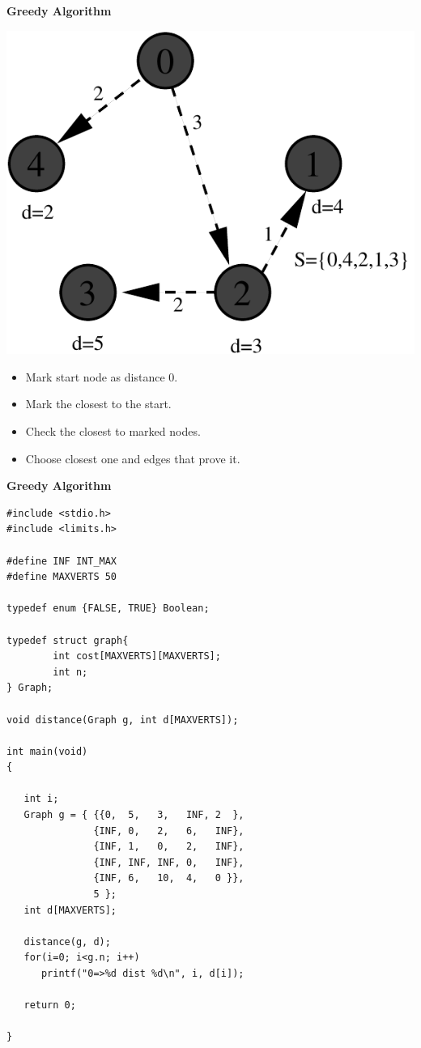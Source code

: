 \documentclass[a4,portraitt]{slides}
\begin{document}
\newpage
{\samepage
\begin{center}
{\Large{\bf Greedy Algorithm}}
\end{center}

\begin{center}
\includegraphics{../Images/graphf.pdf}
\end{center}

\begin{itemize}
\item Mark start node as distance 0.
\item Mark the closest to the start.
\item Check the closest to marked nodes.
\item Choose closest one and edges that prove it.
\end{itemize}
}

\newpage
{\samepage
\begin{center}
{\Large{\bf Greedy Algorithm}}
\end{center}
{\small
\begin{verbatim}
#include <stdio.h>
#include <limits.h>

#define INF INT_MAX
#define MAXVERTS 50

typedef enum {FALSE, TRUE} Boolean;

typedef struct graph{
        int cost[MAXVERTS][MAXVERTS];
        int n;
} Graph;

void distance(Graph g, int d[MAXVERTS]);

int main(void)
{

   int i;
   Graph g = { {{0,  5,   3,   INF, 2  },
               {INF, 0,   2,   6,   INF},
               {INF, 1,   0,   2,   INF},
               {INF, INF, INF, 0,   INF},
               {INF, 6,   10,  4,   0 }},
               5 };
   int d[MAXVERTS];

   distance(g, d);
   for(i=0; i<g.n; i++)
      printf("0=>%d dist %d\n", i, d[i]);

   return 0;

}
\end{verbatim}
}}
\end{document}
